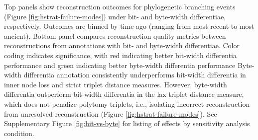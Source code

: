 \begin{figure*}
{  \footnotesize
   Top panels show reconstruction outcomes for phylogenetic branching events (Figure \ref{fig:hstrat-failure-modes}) under bit- and byte-width differentiae, respectively.
   Outcomes are binned by time ago (ranging from most recent to most ancient).
   Bottom panel compares reconstruction quality metrics between reconstructions from annotations with bit- and byte-width differentiae.
   Color coding indicates significance, with red indicating better bit-width differentia performance and green indicating better byte-width differentia performance
   Byte-width differentia annotation consistently underperforms bit-width differentia in inner node loss and strict triplet distance measures.
   However, byte-width differentia outperform bit-width differentia in the lax triplet distance measure, which does not penalize polytomy triplets, i.e., isolating incorrect reconstruction from unresolved reconstruction (Figure \ref{fig:hstrat-failure-modes}).
  See Supplementary Figure \ref{fig:bit-vs-byte} for listing of effects by sensitivity analysis condition.
}
  \label{fig:bit-vs-byte-summary}

\end{figure*}
